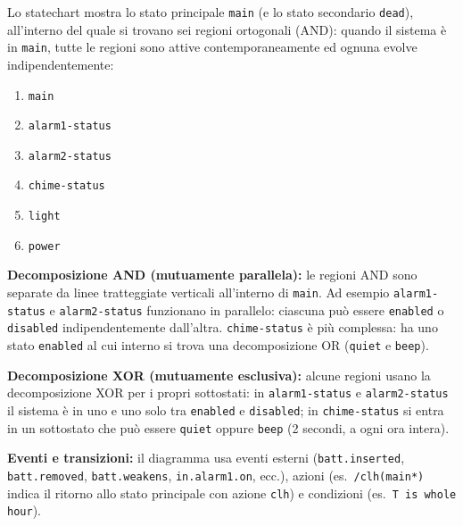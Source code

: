 Lo statechart mostra lo stato principale \texttt{main} (e lo stato secondario \texttt{dead}), all'interno del quale si trovano sei regioni ortogonali (AND): quando il sistema è in \texttt{main}, tutte le regioni sono attive contemporaneamente ed ognuna evolve indipendentemente:
\begin{enumerate}
    \item \texttt{main}
    \item \texttt{alarm1-status}
    \item \texttt{alarm2-status}
    \item \texttt{chime-status}
    \item \texttt{light}
    \item \texttt{power}
\end{enumerate}

\textbf{Decomposizione AND (mutuamente parallela):} le regioni AND sono separate da linee tratteggiate verticali all'interno di \texttt{main}. Ad esempio \texttt{alarm1-status} e \texttt{alarm2-status} funzionano in parallelo: ciascuna può essere \texttt{enabled} o \texttt{disabled} indipendentemente dall'altra. \texttt{chime-status} è più complessa: ha uno stato \texttt{enabled} al cui interno si trova una decomposizione OR (\texttt{quiet} e \texttt{beep}).

\textbf{Decomposizione XOR (mutuamente esclusiva):} alcune regioni usano la decomposizione XOR per i propri sottostati: in \texttt{alarm1-status} e \texttt{alarm2-status} il sistema è in uno e uno solo tra \texttt{enabled} e \texttt{disabled}; in \texttt{chime-status} si entra in un sottostato che può essere \texttt{quiet} oppure \texttt{beep} (2 secondi, a ogni ora intera).

\textbf{Eventi e transizioni:} il diagramma usa eventi esterni (\texttt{batt.inserted}, \texttt{batt.removed}, \texttt{batt.weakens}, \texttt{in.alarm1.on}, ecc.), azioni (es.\ \texttt{/clh(main*)} indica il ritorno allo stato principale con azione \texttt{clh}) e condizioni (es.\ \texttt{T is whole hour}).

